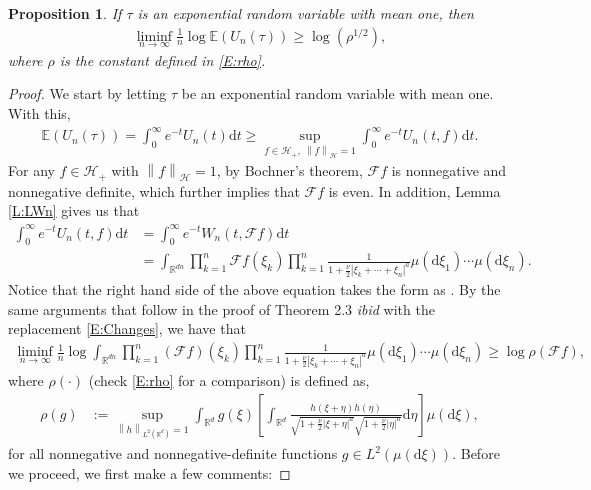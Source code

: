 \documentclass[12pt]{report}
\theoremstyle{plain}
\newtheorem{proposition}[theorem]{Proposition}
\theoremstyle{definition}
\numberwithin{equation}{section}
\newcommand{\R}{\mathbb{R}}
\newcommand{\Norm}[1]{\left\|  #1   \right\|}
\newcommand{\ud}{\ensuremath{ \mathrm{d} }}
\begin{document}
\begin{proposition} \label{P:LogU}
	If $\tau$ is an exponential random variable with mean one, then
	\begin{align*}
	\liminf_{n\to \infty} \frac{1}{n} \log \mathbb{E} (U_n(\tau) ) \ge \log(\rho^{1/2}),
	\end{align*}
	where $\rho$ is the constant defined in \eqref{E:rho}.
\end{proposition}
\begin{proof}
	We start by letting $\tau$ be an exponential random variable with mean one. With this,
	\begin{align*}
	\mathbb{E}\left(U_n(\tau)\right)
	=   \int_0^\infty e^{-t} U_n(t) \ud t
	\ge \sup_{f\in \mathcal{H}_+,\: \Norm{f}_\mathcal{H} =1} \int_0^\infty e^{-t} U_n(t,f) \ud t.
	\end{align*}
	For any $f \in \mathcal{H}_+$ with $\Norm{f}_{\mathcal{H}}= 1$, by Bochner's theorem,
	$\mathcal{F}f$ is nonnegative and nonnegative definite, which further implies that $\mathcal{F}f$
	is even. In addition, Lemma \ref{L:LWn} gives us that
	\begin{align*}
	\int_0^{\infty} e^{-t} U_n(t,f) \ud t
	& = \int_0^\infty e^{-t} W_n(t,\mathcal{F}f) \ud t \\
	& = \int_{\R^{dn}} \prod_{k=1}^n \mathcal{F}f(\xi_k) \prod_{k=1}^n \frac{1}{1+ \frac{\nu}{2}|\xi_k+\cdots + \xi_n|^a} \mu(\ud \xi_1) \cdots \mu(\ud \xi_n).
	\end{align*}
	Notice that the right hand side of the above equation takes the form as \cite[Equation (3.3)]{bass.chen.ea:09:large}. By the same arguments that follow in the proof of Theorem 2.3 {\it ibid} with the
	replacement \eqref{E:Changes}, we have that
	\begin{align*}
	\liminf_{n\to \infty}\frac{1}{n} \log \int_{\R^{dn}} \prod_{k=1}^n(\mathcal{F}f)(\xi_k) \prod_{k=1}^n\frac{1}{1+\frac{\nu}{2}|\xi_k+\cdots+\xi_n|^a} \mu(\ud \xi_1) \cdots \mu(\ud \xi_n) \ge  \log\rho(\mathcal{F}f),
	\end{align*}
	where $\rho(\cdot)$ (check \eqref{E:rho} for a comparison) is defined as,
	\begin{align} \label{E:rho'g}
	\rho(g) &:= \sup_{\Norm{h}_{L^2(\R^d)}=1} \int_{\R^d}g(\xi)
	\left[
	\int_{\R^d} \frac{h(\xi + \eta)h(\eta)}{\sqrt{1+\frac{\nu}{2}|\xi+\eta|^a}\sqrt{1+\frac{\nu}{2}|\eta|^a}} \ud \eta
	\right]
	\mu(\ud \xi),
	\end{align}
	for all nonnegative and nonnegative-definite functions $g\in L^2\left(\mu(\ud\xi)\right)$. Before
	we proceed, we first make a few comments: \medskip
	

\end{proof}
\end{document}
